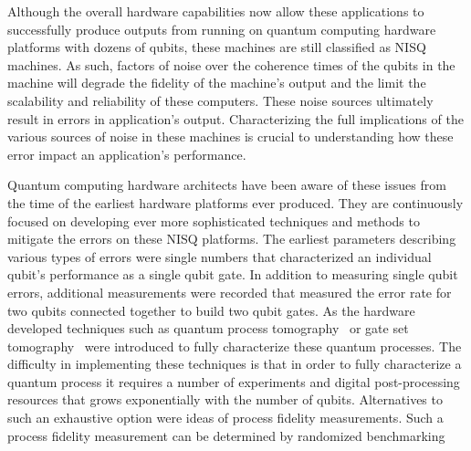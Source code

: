 \documentclass[main.tex]{subfiles}
\begin{document}
Although the overall hardware capabilities now allow these applications to successfully produce outputs from running on quantum computing hardware platforms with dozens of qubits, these machines are still classified as NISQ machines.  As such, factors of noise over the coherence times of the qubits in the machine will degrade the fidelity of the machine’s output and the limit the scalability and reliability of these computers.  These noise sources ultimately result in errors in application’s output.  Characterizing the full implications of the various sources of noise in these machines is crucial to understanding how these error impact an application’s performance.

Quantum computing hardware architects have been aware of these issues from the time of the earliest hardware platforms ever produced.  They are continuously focused on developing ever more sophisticated techniques and methods to mitigate the errors on these NISQ platforms.  The earliest parameters describing various types of errors were single numbers that characterized an individual qubit’s performance as a single qubit gate.  In addition to measuring single qubit errors, additional measurements were recorded that measured the error rate for two qubits connected together to build two qubit gates.  As the hardware developed techniques such as 
quantum process tomography~\cite{ref:Chuang1997} or gate set tomography~\cite{ref:Merkel2012,ref:Blume-Kohout2013,ref:Blume-Kohout2017} were introduced to fully characterize these quantum processes.  The difficulty in implementing these techniques is that in order to fully characterize a quantum process it requires a number of experiments and digital post-processing resources that grows exponentially with the number of qubits.  Alternatives to such an exhaustive option were ideas of process fidelity measurements.  Such a process fidelity measurement can be determined by randomized benchmarking ~\cite{ref:Emerson2005,ref:Dankert2009,ref:Magesan2011} 
\end{document}
